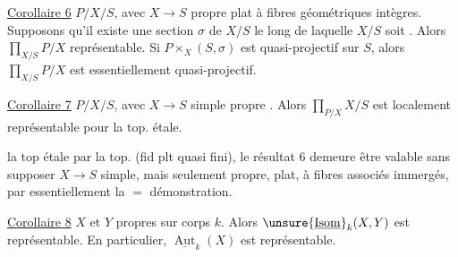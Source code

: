 \uline{Corollaire 6} $P/X/S$, avec $X\to S$ propre plat à fibres géométriques intègres. Supposons qu'il existe une section $\sigma$ de $X/S$ le long de laquelle $X/S$ soit   . Alors $\prod_{X/S}P/X$ représentable. Si $P\mathbin{\times}_X(S,\sigma)$ est quasi-projectif sur $S$, alors $\prod_{X/S}P/X$ est essentiellement quasi-projectif.

\uline{Corollaire 7} $P/X/S$, avec $X\to S$ simple propre  . Alors $\prod_{P/X}X/S$ est localement représentable pour la top. étale.

 la top étale par la top.  (fid plt quasi fini), le résultat 6 demeure être valable sans supposer $X\to S$ simple, mais seulement propre, plat, à fibres   associés immergés, par essentiellement la $=$ démonstration.

\uline{Corollaire 8} $X$ et $Y$ propres sur corps $k$. Alors $\unsure{\underline{\operatorname{Isom}}}_k(X,Y)$ est représentable. En particulier, $\underline{\operatorname{Aut}}_k(X)$ est représentable.

